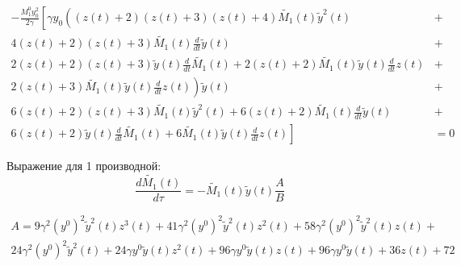 \documentclass[12pt, letterpaper]{article}
\begin{document}
\begin{equation}
\begin{aligned}
- \frac{M^{0}_{1} y_{0}^{2}}{2 \gamma} \left[\gamma y_{0} \left(\left(z{\left(t \right)} + 2\right) \left(z{\left(t \right)} + 3\right) \left(z{\left(t \right)} + 4\right) \tilde{M_1}{\left(t \right)} \tilde{y}^{2}{\left(t \right)} \right. \right. & + \\
\left. \left.  4 \left(z{\left(t \right)} + 2\right) \left(z{\left(t \right)} + 3\right) \tilde{M_1}{\left(t \right)} \frac{d}{d t} \tilde{y}{\left(t \right)} \right. \right. & + \\
\left. \left. 2 \left(z{\left(t \right)} + 2\right) \left(z{\left(t \right)} + 3\right) \tilde{y}{\left(t \right)} \frac{d}{d t} \tilde{M_1}{\left(t \right)} + 2 \left(z{\left(t \right)} + 2\right) \tilde{M_1}{\left(t \right)} \tilde{y}{\left(t \right)} \frac{d}{d t} z{\left(t \right)} \right. \right. & + \\
\left. \left. 2 \left(z{\left(t \right)} + 3\right) \tilde{M_1}{\left(t \right)} \tilde{y}{\left(t \right)} \frac{d}{d t} z{\left(t \right)}\right) \tilde{y}{\left(t \right)} \right. & + \\
\left. 6 \left(z{\left(t \right)} + 2\right) \left(z{\left(t \right)} + 3\right) \tilde{M_1}{\left(t \right)} \tilde{y}^{2}{\left(t \right)} + 6 \left(z{\left(t \right)} + 2\right) \tilde{M_1}{\left(t \right)} \frac{d}{d t} \tilde{y}{\left(t \right)} \right. & + \\
\left. 6 \left(z{\left(t \right)} + 2\right) \tilde{y}{\left(t \right)} \frac{d}{d t} \tilde{M_1}{\left(t \right)} + 6 \tilde{M_1}{\left(t \right)} \tilde{y}{\left(t \right)} \frac{d}{d t} z{\left(t \right)}\right] & = 0
\end{aligned}
\end{equation}


Выражение для 1 производной:
\begin{equation}
\frac{d \tilde{M_1}(t)}{d \tau} = - \tilde{M_1}(t) \tilde{y}(t) \frac{A}{B}
\end{equation}

\begin{equation}
	\begin{aligned}
		A = 9 \gamma^{2} \left(y^{0}\right)^{2} \tilde{y}^{2}{\left(t \right)} z^{3}{\left(t \right)} + 41 \gamma^{2} \left(y^{0}\right)^{2} \tilde{y}^{2}{\left(t \right)} z^{2}{\left(t \right)} + 58 \gamma^{2} \left(y^{0}\right)^{2} \tilde{y}^{2}{\left(t \right)} z{\left(t \right)} + \\
		24 \gamma^{2} \left(y^{0}\right)^{2} \tilde{y}^{2}{\left(t \right)} + 24 \gamma y^{0} \tilde{y}{\left(t \right)} z^{2}{\left(t \right)} + 96 \gamma y^{0} \tilde{y}{\left(t \right)} z{\left(t \right)} + 96 \gamma y^{0} \tilde{y}{\left(t \right)} + 36 z{\left(t \right)} + 72 \\
	\end{aligned}
\end{equation}
\end{document}
